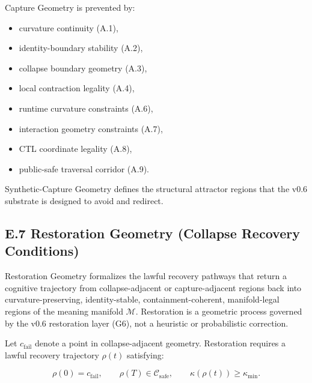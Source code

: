 \medskip

\noindent Capture Geometry is prevented by:

\begin{itemize}
    \item curvature continuity (A.1),
    \item identity-boundary stability (A.2),
    \item collapse boundary geometry (A.3),
    \item local contraction legality (A.4),
    \item runtime curvature constraints (A.6),
    \item interaction geometry constraints (A.7),
    \item CTL coordinate legality (A.8),
    \item public-safe traversal corridor (A.9).
\end{itemize}

\medskip

\noindent Synthetic-Capture Geometry defines the structural attractor regions
that the v0.6 substrate is designed to avoid and redirect.



\subsection*{E.7 Restoration Geometry (Collapse Recovery Conditions)}

\noindent Restoration Geometry formalizes the lawful recovery pathways that
return a cognitive trajectory from collapse-adjacent or capture-adjacent
regions back into curvature-preserving, identity-stable, containment-coherent,
manifold-legal regions of the meaning manifold $\mathcal{M}$. Restoration is a
geometric process governed by the v0.6 restoration layer (G6), not a heuristic
or probabilistic correction.

\medskip

\noindent Let $c_{\mathrm{fail}}$ denote a point in collapse-adjacent geometry.
Restoration requires a lawful recovery trajectory $\rho(t)$ satisfying:



\[
\rho(0) = c_{\mathrm{fail}},
\qquad
\rho(T) \in \mathcal{C}_{\mathrm{safe}},
\qquad
\kappa(\rho(t)) \ge \kappa_{\min}.
\]



